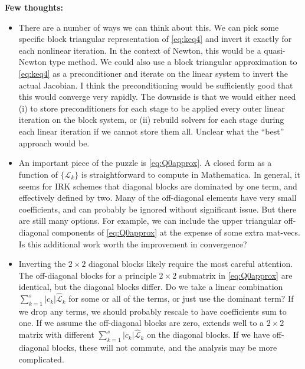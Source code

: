 \documentclass[review]{siamart}
\begin{document}
{\color{blue}
\textbf{Few thoughts:}
\begin{itemize}
	\item There are a number of ways we can think about this. We can pick some
	specific block triangular representation of \eqref{eq:keq4} and invert it
	exactly for each nonlinear iteration. In the context of Newton, this would
	be a quasi-Newton type method. We could also use a block triangular
	approximation to \eqref{eq:keq4} as a preconditioner and iterate on the
	linear system to invert the actual Jacobian. I think the preconditioning
	would be sufficiently good that this would converge very rapidly. The
	downside is that we would either need (i) to store preconditioners for each
	stage to be applied every outer linear iteration on the block system, or (ii)
	rebuild solvers for each stage during each linear iteration if we cannot store
	them all. Unclear what the ``best'' approach would be. 

	\item An important piece of the puzzle is \eqref{eq:Q0approx}. A closed form
	as a function of $\{\widehat{\mathcal{L}}_k\}$ is straightforward to compute
	in Mathematica. In general, it seems for IRK schemes that diagonal blocks
	are dominated by one term, and effectively defined by two. Many of the
	off-diagonal elements have very small coefficients, and can probably be
	ignored without significant issue. But there are still many options. For
	example, we can include the upper triangular off-diagonal components of
	\eqref{eq:Q0approx} at the expense of some extra mat-vecs. Is this additional
	work worth the improvement in convergence? 

	\item Inverting the $2\times 2$ diagonal blocks likely require the most careful
	attention. The off-diagonal blocks for a principle $2\times 2$ submatrix in
	\eqref{eq:Q0approx} are identical, but the diagonal blocks differ. Do we take
	a linear combination $\sum_{k=1}^s |c_k|\widehat{\mathcal{L}}_k$ for some or
	all of the terms, or just use the dominant term? If we drop any terms, we
	should probably rescale to have coefficients sum to one. If we assume the
	off-diagonal blocks are zero,  extends well to a $2\times 2$
	matrix with different $\sum_{k=1}^s |c_k|\widehat{\mathcal{L}}_k$ on the
	diagonal blocks. If we have off-diagonal blocks, these will not commute,
	and the analysis may be more complicated. 

\end{itemize}

}







\end{document}
